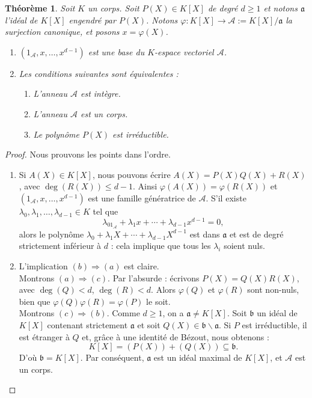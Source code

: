 \documentclass[a4paper, titlepage]{article}
\newtheorem{theo}{Théorème}[section]
\theoremstyle{definition}
\theoremstyle{remark}
\begin{document}
\begin{theo}\label{theoSurjecAnnPoly}
Soit $K$ un corps. Soit $P(X) \in K[X]$ de degré $d \geqslant 1$ et notons $\mathfrak{a}$ l'idéal de $K[X]$ engendré par $P(X)$. Notons $\varphi: K[X] \rightarrow \mathcal{A} := K[X] / \mathfrak{a}$ la surjection canonique, et posons $x = \varphi(X)$. \begin{enumerate}
\item $(1_\mathcal{A}, x, \dots, x^{d-1})$ est une base du $K$-espace vectoriel $\mathcal A$.
\item Les conditions suivantes sont équivalentes : \begin{enumerate}
\item L'anneau $\mathcal{A}$ est intègre.
\item L'anneau $\mathcal{A}$ est un corps.
\item Le polynôme $P(X)$ est irréductible.
\end{enumerate}
\end{enumerate}
\end{theo}

\begin{proof} Nous prouvons les points dans l'ordre.
\begin{enumerate}
\item Si $A(X) \in K[X]$, nous pouvons écrire $A(X) = P(X)Q(X)+R(X)$, avec $\deg(R(X)) \leqslant d-1$. Ainsi $\varphi(A(X)) = \varphi(R(X))$ et $(1_\mathcal{A}, x, \dots, x^{d-1})$ est une famille génératrice de $\mathcal{A}$.
S'il existe $\lambda_0, \lambda_1, \dots, \lambda_{d-1} \in K$ tel que 
$$\lambda_01_\mathcal{A} + \lambda_1x + \cdots + \lambda_{d-1}x^{d-1} = 0,$$
alors le polynôme $\lambda_0 + \lambda_1X + \cdots + \lambda_{d-1}X^{d-1}$ est dans $\mathfrak{a}$ et est de degré strictement inférieur à $d$ : cela implique que tous les $\lambda_i$ soient nuls.
\item L'implication $(b) \Rightarrow (a)$ est claire.\\ Montrons $(a) \Rightarrow (c)$. Par l'absurde : écrivons $P(X) = Q(X)R(X)$, avec $\deg(Q) < d$, $\deg(R) < d$. Alors $\varphi(Q)$ et $\varphi(R)$ sont non-nuls, bien que $\varphi(Q)\varphi(R) = \varphi(P)$ le soit.\\
Montrons $(c) \Rightarrow (b)$. Comme $d \geqslant 1$, on a $\mathfrak{a} \neq K[X]$. Soit $\mathfrak{b}$ un idéal de $K[X]$ contenant strictement $\mathfrak{a}$ et soit $Q(X) \in \mathfrak{b} \backslash \mathfrak{a}$. Si $P$ est irréductible, il est étranger à $Q$ et, grâce à une identité de Bézout, nous obtenons : 
$$K[X] = (P(X)) + (Q(X)) \subseteq \mathfrak{b}.$$
D'où $\mathfrak{b} = K[X]$. Par conséquent, $\mathfrak{a}$ est un idéal maximal de $K[X]$, et $\mathcal{A}$ est un corps.
\end{enumerate}
\end{proof}
\end{document}
